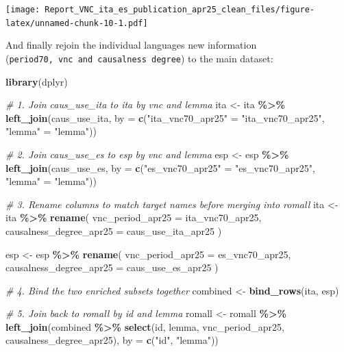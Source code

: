\documentclass[
]{article}
\newenvironment{Shaded}{\begin{snugshade}}{\end{snugshade}}
\newcommand{\AttributeTok}[1]{\textcolor[rgb]{0.13,0.29,0.53}{#1}}
\newcommand{\CommentTok}[1]{\textcolor[rgb]{0.56,0.35,0.01}{\textit{#1}}}
\newcommand{\FunctionTok}[1]{\textcolor[rgb]{0.13,0.29,0.53}{\textbf{#1}}}
\newcommand{\NormalTok}[1]{#1}
\newcommand{\OtherTok}[1]{\textcolor[rgb]{0.56,0.35,0.01}{#1}}
\newcommand{\SpecialCharTok}[1]{\textcolor[rgb]{0.81,0.36,0.00}{\textbf{#1}}}
\newcommand{\StringTok}[1]{\textcolor[rgb]{0.31,0.60,0.02}{#1}}
\begin{document}
\texttt{[image: Report\_VNC\_ita\_es\_publication\_apr25\_clean\_files/figure-latex/unnamed-chunk-10-1.pdf]}

And finally rejoin the individual languages new information
(\texttt{period70,\ vnc\ and\ causalness\ degree}) to the main dataset:

\begin{Shaded}
\begin{Highlighting}[]
\FunctionTok{library}\NormalTok{(dplyr)}

\CommentTok{\# 1. Join caus\_use\_ita to ita by vnc and lemma}
\NormalTok{ita }\OtherTok{\textless{}{-}}\NormalTok{ ita }\SpecialCharTok{\%\textgreater{}\%}
  \FunctionTok{left\_join}\NormalTok{(caus\_use\_ita, }\AttributeTok{by =} \FunctionTok{c}\NormalTok{(}\StringTok{"ita\_vnc70\_apr25"} \OtherTok{=} \StringTok{"ita\_vnc70\_apr25"}\NormalTok{, }\StringTok{"lemma"} \OtherTok{=} \StringTok{"lemma"}\NormalTok{))}

\CommentTok{\# 2. Join caus\_use\_es to esp by vnc and lemma}
\NormalTok{esp }\OtherTok{\textless{}{-}}\NormalTok{ esp }\SpecialCharTok{\%\textgreater{}\%}
  \FunctionTok{left\_join}\NormalTok{(caus\_use\_es, }\AttributeTok{by =} \FunctionTok{c}\NormalTok{(}\StringTok{"es\_vnc70\_apr25"} \OtherTok{=} \StringTok{"es\_vnc70\_apr25"}\NormalTok{, }\StringTok{"lemma"} \OtherTok{=} \StringTok{"lemma"}\NormalTok{))}

\CommentTok{\# 3. Rename columns to match target names before merging into romall}
\NormalTok{ita }\OtherTok{\textless{}{-}}\NormalTok{ ita }\SpecialCharTok{\%\textgreater{}\%}
  \FunctionTok{rename}\NormalTok{(}
    \AttributeTok{vnc\_period\_apr25 =}\NormalTok{ ita\_vnc70\_apr25,}
    \AttributeTok{causalness\_degree\_apr25 =}\NormalTok{ caus\_use\_ita\_apr25}
\NormalTok{  )}

\NormalTok{esp }\OtherTok{\textless{}{-}}\NormalTok{ esp }\SpecialCharTok{\%\textgreater{}\%}
  \FunctionTok{rename}\NormalTok{(}
    \AttributeTok{vnc\_period\_apr25 =}\NormalTok{ es\_vnc70\_apr25,}
    \AttributeTok{causalness\_degree\_apr25 =}\NormalTok{ caus\_use\_es\_apr25}
\NormalTok{  )}

\CommentTok{\# 4. Bind the two enriched subsets together}
\NormalTok{combined }\OtherTok{\textless{}{-}} \FunctionTok{bind\_rows}\NormalTok{(ita, esp)}

\CommentTok{\# 5. Join back to romall by id and lemma}
\NormalTok{romall }\OtherTok{\textless{}{-}}\NormalTok{ romall }\SpecialCharTok{\%\textgreater{}\%}
  \FunctionTok{left\_join}\NormalTok{(combined }\SpecialCharTok{\%\textgreater{}\%} \FunctionTok{select}\NormalTok{(id, lemma, vnc\_period\_apr25, causalness\_degree\_apr25),}
            \AttributeTok{by =} \FunctionTok{c}\NormalTok{(}\StringTok{"id"}\NormalTok{, }\StringTok{"lemma"}\NormalTok{))}



\end{Highlighting}
\end{Shaded}
\end{document}
